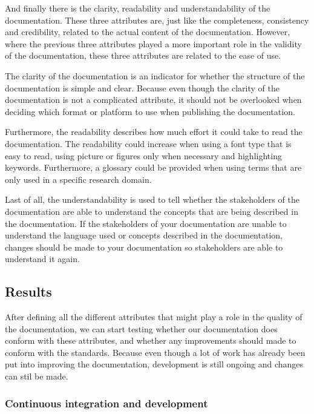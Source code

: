 \documentclass{article}
\begin{document}
    And finally there is the clarity, readability and understandability of the documentation. These three attributes are, just like the completeness, 
    consistency and credibility, related to the actual content of the documentation. However, where the previous three attributes played a more important
    role in the validity of the documentation, these three attributes are related to the ease of use.

    The clarity of the documentation is an indicator for whether the structure of the documentation is simple and clear. Because even though the clarity
    of the documentation is not a complicated attribute, it should not be overlooked when deciding which format or platform to use when publishing
    the documentation.\cite{guillemette}

    Furthermore, the readability describes how much effort it could take to read the documentation. The readability could increase when using a font type
    that is easy to read, using picture or figures only when necessary and highlighting keywords. Furthermore, a glossary could be provided when using terms
    that are only used in a specific research domain.\cite{voigt}\cite{garousi}\cite{guillemette}

    Last of all, the understandability is used to tell whether the stakeholders of the documentation are able to understand the concepts that are being
    described in the documentation. If the stakeholders of your documentation are unable to understand the language used or concepts described in the documentation,
    changes should be made to your documentation so stakeholders are able to understand it again.\cite{voigt}\cite{jansen}

\subsection{Results}


    After defining all the different attributes that might play a role in the quality of the documentation, we can start testing whether our documentation does conform
    with these attributes, and whether any improvements should made to conform with the standards. Because even though a lot of work has already been put into improving
    the documentation, development is still ongoing and changes can stil be made.

    \subsubsection{Continuous integration and development}
\end{document}

